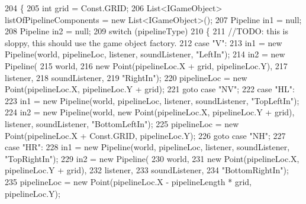 \begin{DoxyCode}
204         \{
205             \textcolor{keywordtype}{int} grid = Const.GRID;
206             List<IGameObject> listOfPipelineComponents = \textcolor{keyword}{new} List<IGameObject>();
207             Pipeline in1 = null;
208             Pipeline in2 = null;
209             \textcolor{keywordflow}{switch} (pipelineType)
210             \{
211                 \textcolor{comment}{//TODO: this is sloppy, this should use the game object factory.}
212                 \textcolor{keywordflow}{case} \textcolor{stringliteral}{"V"}:
213                     in1 = \textcolor{keyword}{new} Pipeline(world, pipelineLoc, listener, soundListener, \textcolor{stringliteral}{"LeftIn"});
214                     in2 = \textcolor{keyword}{new} Pipeline(
215                         world,
216                         \textcolor{keyword}{new} Point(pipelineLoc.X + grid, pipelineLoc.Y),
217                         listener,
218                         soundListener,
219                         \textcolor{stringliteral}{"RightIn"});
220                     pipelineLoc = \textcolor{keyword}{new} Point(pipelineLoc.X, pipelineLoc.Y + grid);
221                     \textcolor{keywordflow}{goto} \textcolor{keywordflow}{case} \textcolor{stringliteral}{"NV"};
222                 \textcolor{keywordflow}{case} \textcolor{stringliteral}{"HL"}:
223                     in1 = \textcolor{keyword}{new} Pipeline(world, pipelineLoc, listener, soundListener, \textcolor{stringliteral}{"TopLeftIn"});
224                     in2 = \textcolor{keyword}{new} Pipeline(world, \textcolor{keyword}{new} Point(pipelineLoc.X, pipelineLoc.Y + grid), listener, 
      soundListener, \textcolor{stringliteral}{"BottomLeftIn"});
225                     pipelineLoc = \textcolor{keyword}{new} Point(pipelineLoc.X + Const.GRID, pipelineLoc.Y);
226                     \textcolor{keywordflow}{goto} \textcolor{keywordflow}{case} \textcolor{stringliteral}{"NH"};
227                 \textcolor{keywordflow}{case} \textcolor{stringliteral}{"HR"}:
228                     in1 = \textcolor{keyword}{new} Pipeline(world, pipelineLoc, listener, soundListener, \textcolor{stringliteral}{"TopRightIn"});
229                     in2 = \textcolor{keyword}{new} Pipeline(
230                         world,
231                         \textcolor{keyword}{new} Point(pipelineLoc.X, pipelineLoc.Y + grid),
232                         listener,
233                         soundListener,
234                         \textcolor{stringliteral}{"BottomRightIn"});
235                     pipelineLoc = \textcolor{keyword}{new} Point(pipelineLoc.X - pipelineLength * grid, pipelineLoc.Y);

\end{DoxyCode}
